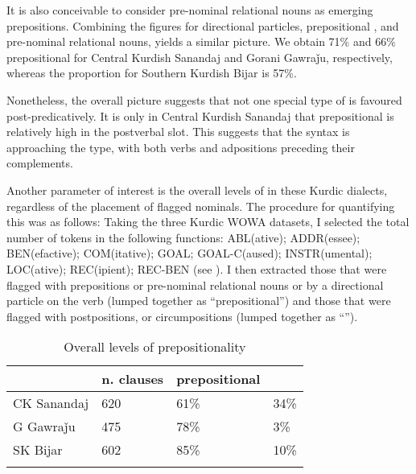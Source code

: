 \documentclass[output=paper,colorlinks,citecolor=brown]{langscibook}
\begin{document}
\begin{sloppypar}
It is also conceivable to consider pre-nominal relational nouns as emerging prepositions. Combining the figures for directional particles, prepositional , and pre-nominal relational nouns, yields a similar picture. We obtain 71\% and 66\% prepositional  for Central Kurdish Sanandaj and Gorani Gawraǰu, respectively, whereas the proportion for Southern Kurdish Bijar is 57\%. 


Nonetheless, the overall picture suggests that not one special type of  is favoured post-predicatively. It is only in Central Kurdish Sanandaj that prepositional  is relatively high in the postverbal slot. This suggests that the syntax is approaching the  type, with both verbs and adpositions preceding their complements.

\begin{sloppypar}
Another parameter of interest is the overall levels of  in these Kurdic dialects, regardless of the placement of flagged nominals. The procedure for quantifying this was as follows: Taking the three Kurdic WOWA datasets, I selected the total number of tokens in the following functions: ABL(ative); ADDR(essee); BEN(efactive); COM(itative); GOAL; GOAL-C(aused); INSTR(umental); LOC(ative); REC(ipient); REC-BEN (see ). I then extracted those that were flagged with prepositions or pre-nominal relational nouns or by a directional particle on the verb (lumped together as ``prepositional'') and those that were flagged with postpositions, or circumpositions (lumped together as ``'').
\end{sloppypar}
 

\begin{table}
    \begin{tabularx}{\textwidth}{lYYY}
\lsptoprule
& n. clauses & prepositional & \, \\
\midrule
CK Sanandaj& 620& 61\%& 34\% \\
G Gawraǰu& 475& 78\%& 3\% \\
SK Bijar& 602& 85\%& 10\% \\
\lspbottomrule
    \end{tabularx}
    \caption{Overall levels of prepositionality}
    \label{MGKC:tab:12}
\end{table}


\end{sloppypar}
\end{document}
